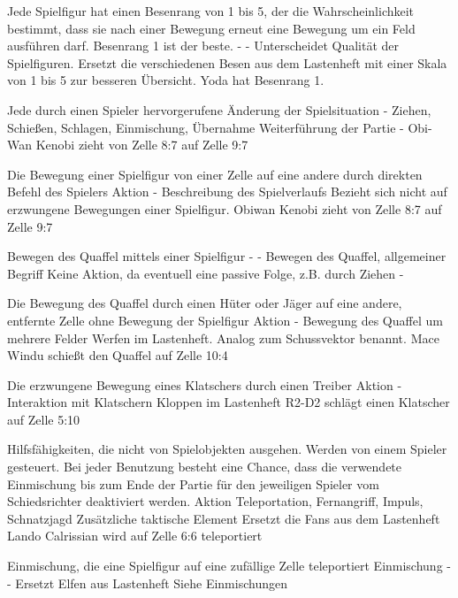 {Jede Spielfigur hat einen Besenrang von 1 bis 5, der die Wahrscheinlichkeit bestimmt, dass sie nach einer Bewegung erneut eine Bewegung um ein Feld ausführen darf. Besenrang 1 ist der beste.}
{-}
{-}
{Unterscheidet Qualität der Spielfiguren.}
{Ersetzt die verschiedenen \glqq{}Besen\grqq{} aus dem Lastenheft mit einer Skala von 1 bis 5 zur besseren Übersicht.}
{Yoda hat Besenrang 1.}

{Jede durch einen Spieler hervorgerufene Änderung der Spielsituation}
{-}
{Ziehen, Schießen, Schlagen, Einmischung, Übernahme}
{Weiterführung der Partie}
{-}
{Obi-Wan Kenobi zieht von Zelle 8:7 auf Zelle 9:7}

{Die Bewegung einer Spielfigur von einer Zelle auf eine andere durch direkten Befehl des Spielers}
{Aktion}
{-}
{Beschreibung des Spielverlaufs}
{Bezieht sich nicht auf erzwungene Bewegungen einer Spielfigur.}
{Obiwan Kenobi zieht von Zelle 8:7 auf Zelle 9:7}

{Bewegen des Quaffel mittels einer Spielfigur}
{-}
{-}
{Bewegen des Quaffel, allgemeiner Begriff}
{Keine Aktion, da eventuell eine passive Folge, z.B. durch Ziehen}
{-}

{Die Bewegung des Quaffel durch einen Hüter oder Jäger auf eine andere, entfernte Zelle ohne Bewegung der Spielfigur}
{Aktion}
{-}
{Bewegung des Quaffel um mehrere Felder}
{\glqq{}Werfen\grqq{}  im Lastenheft. Analog zum Schussvektor benannt.}
{Mace Windu schießt den Quaffel auf Zelle 10:4}

{Die erzwungene Bewegung eines Klatschers durch einen Treiber}
{Aktion}
{-}
{Interaktion mit Klatschern}
{\glqq{}Kloppen\grqq{}  im Lastenheft}
{R2-D2 schlägt einen Klatscher auf Zelle 5:10}

{Hilfsfähigkeiten, die nicht von Spielobjekten ausgehen. Werden von einem Spieler gesteuert. Bei jeder Benutzung besteht eine Chance, dass die verwendete Einmischung bis zum Ende der Partie für den jeweiligen Spieler vom Schiedsrichter deaktiviert werden.}
{Aktion}
{Teleportation, Fernangriff, Impuls, Schnatzjagd}
{Zusätzliche taktische Element}
{Ersetzt die \glqq{}Fans\grqq{}  aus dem Lastenheft}
{Lando Calrissian wird auf Zelle 6:6 teleportiert}

{Einmischung, die eine Spielfigur auf eine zufällige Zelle teleportiert}
{Einmischung}
{-}
{-}
{Ersetzt \glqq{}Elfen\grqq{}  aus Lastenheft}
{Siehe \glqq{}Einmischungen\grqq{} }

